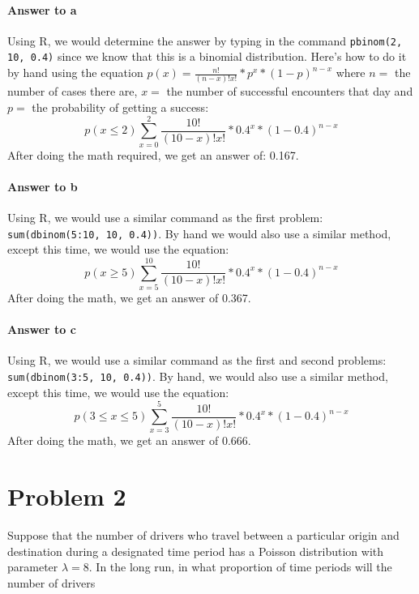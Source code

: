 \documentclass{article}
\newcommand{\code}[1]{\texttt{#1}}
\begin{document}
	\paragraph{Answer to a} Using R, we would determine the answer by typing in the command 
	\code{pbinom(2, 10, 0.4)} since we know that this is a binomial distribution. Here's how to do it 
	by hand using the equation $p(x) = \frac{n!}{(n-x)!x!}*p^{x} * (1-p)^{n-x}$ where $n=$ the 
	number of cases there are, $x=$ the number of successful encounters that day and $p=$ the 
	probability of getting a success:
	\begin{displaymath}
		p(x \le 2)  \sum_{x=0}^{2} \frac{10!}{(10-x)!x!}*0.4^{x} * (1-0.4)^{n-x}
	\end{displaymath}
	After doing the math required, we get an answer of: 0.167. %

	\paragraph{Answer to b} Using R, we would use a similar command as the first problem: 
	\code{sum(dbinom(5:10, 10, 0.4))}. By hand we would also use a similar method, except this 
	time, we would use the equation:
	\begin{displaymath}
		p(x \ge 5)  \sum_{x=5}^{10} \frac{10!}{(10-x)!x!}*0.4^{x} * (1-0.4)^{n-x}
	\end{displaymath}
	After doing the math, we get an answer of 0.367. %

	\paragraph{Answer to c} Using R, we would use a similar command as the first and second 
	problems: \code{sum(dbinom(3:5, 10, 0.4))}. By hand, we would also use a similar method, 
	except this time, we would use the equation:
	\begin{displaymath}
		p(3 \le x \le 5)  \sum_{x=3}^{5} \frac{10!}{(10-x)!x!}*0.4^{x} * (1-0.4)^{n-x}
	\end{displaymath}
	After doing the math, we get an answer of 0.666. %

\section*{Problem 2}

	Suppose that the number of drivers who travel between a particular origin and destination 
	during a designated time period has a Poisson distribution with parameter $\lambda = 8$. In the 
	long run, in what proportion of time periods will the number of drivers \\
\end{document}
